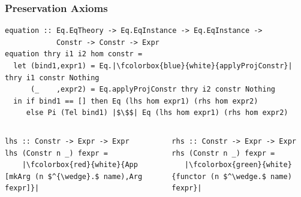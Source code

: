 \documentclass[t,10pt,numbers,fleqn,usenames,xcolor=dvipsnames]{beamer}
\begin{document}
\appendix

\plain{}

\begin{frame}[fragile] 
\frametitle{Preservation Axioms} 


\begin{verbatim} 
equation :: Eq.EqTheory -> Eq.EqInstance -> Eq.EqInstance -> 
            Constr -> Constr -> Expr 
equation thry i1 i2 hom constr =
  let (bind1,expr1) = Eq.|\fcolorbox{blue}{white}{applyProjConstr}| thry i1 constr Nothing
      (_    ,expr2) = Eq.applyProjConstr thry i2 constr Nothing 
  in if bind1 == [] then Eq (lhs hom expr1) (rhs hom expr2)
     else Pi (Tel bind1) |$\$$| Eq (lhs hom expr1) (rhs hom expr2)
\end{verbatim}
\begin{columns}
\begin{column}{0.45\textwidth} 
\begin{verbatim}
lhs :: Constr -> Expr -> Expr
lhs (Constr n _) fexpr =
    |\fcolorbox{red}{white}{App [mkArg (n $^{\wedge}.$ name),Arg fexpr]}|
\end{verbatim}
 
\end{column}
\begin{column}{0.45\textwidth} 
\begin{verbatim}
rhs :: Constr -> Expr -> Expr
rhs (Constr n _) fexpr =
   |\fcolorbox{green}{white}{functor (n $^\wedge.$ name) fexpr}|
\end{verbatim}  
% 
\end{column}
\end{columns}
\end{frame}
\end{document}
